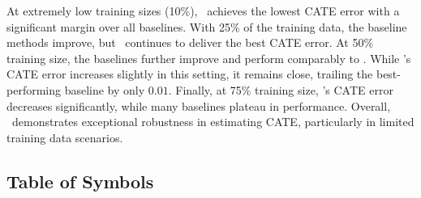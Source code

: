 At extremely low training sizes (10\%), \our\ achieves the lowest CATE error with a significant margin over all baselines. With 25\% of the training data, the baseline methods improve, but \our\ continues to deliver the best CATE error. At 50\% training size, the baselines further improve and perform comparably to \our. While \our's CATE error increases slightly in this setting, it remains close, trailing the best-performing baseline by only $0.01$. Finally, at 75\% training size, \our's CATE error decreases significantly, while many baselines plateau in performance. Overall, \our\ demonstrates exceptional robustness in estimating CATE, particularly in limited training data scenarios.


\subsection{Table of Symbols}
\label{app:symbols}
